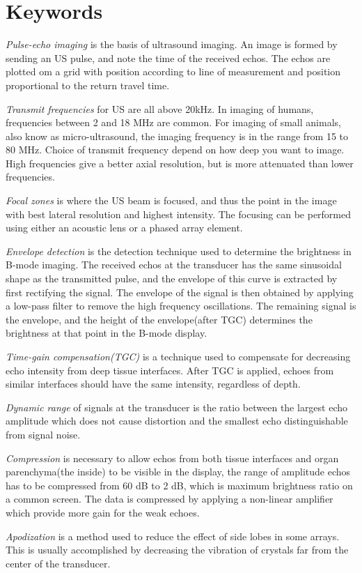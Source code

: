 \section*{Keywords}
\textit{Pulse-echo imaging} is the basis of ultrasound imaging. An image is formed by sending an US pulse, and note the time of the received echos. The echos are plotted om a grid with position according to line of measurement and position proportional to the return travel time.

\textit{Transmit frequencies} for US are all above 20kHz. In imaging of humans, frequencies between 2 and 18 MHz are common. For imaging of small animals, also know as micro-ultrasound, the imaging frequency is in the range from 15 to 80 MHz. Choice of transmit frequency depend on how deep you want to image. High frequencies give a better axial resolution, but is more attenuated than lower frequencies.

\textit{Focal zones} is where the US beam is focused, and thus the point in the image with best lateral resolution and highest intensity. The focusing can be performed using either an acoustic lens or a phased array element. 

\textit{Envelope detection} is the detection technique used to determine the brightness in B-mode imaging. The received echos at the transducer has the same sinusoidal shape as the transmitted pulse, and the envelope of this curve is extracted by first rectifying the signal. The envelope of the signal is then obtained by applying a low-pass filter to remove the high frequency oscillations. The remaining signal is the envelope, and the height of the envelope(after TGC) determines the brightness at that point in the B-mode display. 

\textit{Time-gain compensation(TGC)} is a technique used to compensate for decreasing echo intensity from deep tissue interfaces. After TGC is applied, echoes from similar interfaces should have the same intensity, regardless of depth.

\textit{Dynamic range} of signals at the transducer is the ratio between the largest echo amplitude which does not cause distortion and the smallest echo distinguishable from signal noise.

\textit{Compression} is necessary to allow echos from both tissue interfaces and organ parenchyma(the inside) to be visible in the display, the range of amplitude echos has to be compressed from 60 dB to 2 dB, which is maximum brightness ratio on a common screen. The data is compressed by applying a non-linear amplifier which provide more gain for the weak echoes. 

\textit{Apodization} is a method used to reduce the effect of side lobes in some arrays. This is usually accomplished by decreasing the vibration of crystals far from the center of the transducer.



